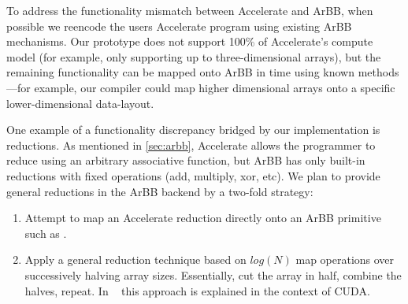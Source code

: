 To address the functionality mismatch between Accelerate and ArBB,
when possible we reencode the users Accelerate program using existing
ArBB mechanisms.  Our prototype does not support 100\% of Accelerate's
compute model (for example, only supporting  up to three-dimensional
arrays), but the remaining functionality can be mapped onto ArBB in
time using known methods---for example, our compiler could map higher
dimensional arrays onto a specific lower-dimensional data-layout.

%

One example of a functionality discrepancy bridged by our
implementation is reductions.  As mentioned in \ref{sec:arbb},
Accelerate allows the programmer to reduce using an arbitrary
associative function, but ArBB has only built-in reductions with fixed
operations (add, multiply, xor, etc). We plan to provide general reductions in
the ArBB backend by a two-fold strategy:

\begin{enumerate}
\item Attempt to map an Accelerate reduction directly onto an ArBB
  primitive such as .
\item Apply a general reduction technique based on $log(N)$ map
  operations over successively halving array sizes.  Essentially, cut
  the array in half, combine the halves, repeat. In ~
  this approach is explained in the context of CUDA. 
\end{enumerate}


